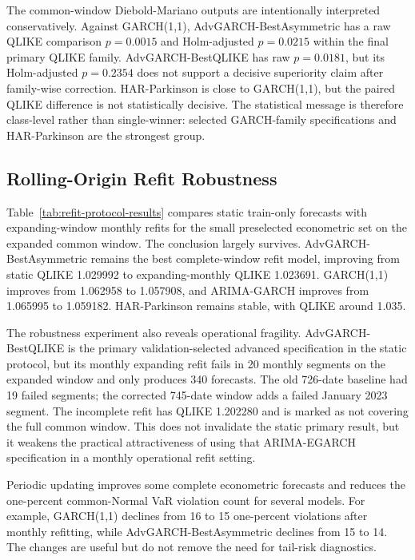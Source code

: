 The common-window Diebold-Mariano outputs are intentionally interpreted conservatively. Against GARCH(1,1), AdvGARCH-BestAsymmetric has a raw QLIKE comparison \(p=0.0015\) and Holm-adjusted \(p=0.0215\) within the final primary QLIKE family. AdvGARCH-BestQLIKE has raw \(p=0.0181\), but its Holm-adjusted \(p=0.2354\) does not support a decisive superiority claim after family-wise correction. HAR-Parkinson is close to GARCH(1,1), but the paired QLIKE difference is not statistically decisive. The statistical message is therefore class-level rather than single-winner: selected GARCH-family specifications and HAR-Parkinson are the strongest group.

\subsection{Rolling-Origin Refit Robustness}



Table~\ref{tab:refit-protocol-results} compares static train-only forecasts with expanding-window monthly refits for the small preselected econometric set on the expanded common window. The conclusion largely survives. AdvGARCH-BestAsymmetric remains the best complete-window refit model, improving from static QLIKE 1.029992 to expanding-monthly QLIKE 1.023691. GARCH(1,1) improves from 1.062958 to 1.057908, and ARIMA-GARCH improves from 1.065995 to 1.059182. HAR-Parkinson remains stable, with QLIKE around 1.035.

The robustness experiment also reveals operational fragility. AdvGARCH-BestQLIKE is the primary validation-selected advanced specification in the static protocol, but its monthly expanding refit fails in 20 monthly segments on the expanded window and only produces 340 forecasts. The old 726-date baseline had 19 failed segments; the corrected 745-date window adds a failed January 2023 segment. The incomplete refit has QLIKE 1.202280 and is marked as not covering the full common window. This does not invalidate the static primary result, but it weakens the practical attractiveness of using that ARIMA-EGARCH specification in a monthly operational refit setting.



Periodic updating improves some complete econometric forecasts and reduces the one-percent common-Normal VaR violation count for several models. For example, GARCH(1,1) declines from 16 to 15 one-percent violations after monthly refitting, while AdvGARCH-BestAsymmetric declines from 15 to 14. The changes are useful but do not remove the need for tail-risk diagnostics.

